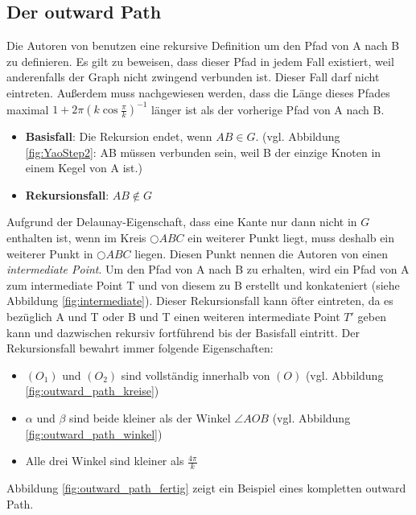 \documentclass[a4paper,twoside]{IEEEtran}
\begin{document}
\subsection{Der outward Path}
Die Autoren von \cite{kanj} benutzen eine rekursive Definition um den Pfad von A nach B zu definieren.
Es gilt zu beweisen, dass dieser Pfad in jedem Fall existiert, weil anderenfalls der Graph nicht zwingend verbunden ist.
Dieser Fall darf nicht eintreten.
Außerdem muss nachgewiesen werden, dass die Länge dieses Pfades maximal
$1+2\pi(k \cos{\frac{\pi}{k}})^{-1} $ länger ist als der vorherige Pfad von A nach B.


\begin{itemize}
\item \textbf{Basisfall}: Die Rekursion endet, wenn $AB \in G $. (vgl. Abbildung \ref{fig:YaoStep2}: AB müssen verbunden sein, weil B der einzige Knoten in einem Kegel von A ist.)
\item \textbf{Rekursionsfall}: $AB \notin G $
\end{itemize}

Aufgrund der Delaunay-Eigenschaft, dass eine Kante nur dann nicht in $G $ enthalten ist, wenn im Kreis $\bigcirc {ABC} $ ein weiterer Punkt liegt, muss deshalb ein weiterer Punkt in  $\bigcirc {ABC} $ liegen.
Diesen Punkt nennen die Autoren von \cite{kanj} einen \emph{intermediate Point}.
Um den Pfad von A nach B zu erhalten, wird ein Pfad von A zum intermediate Point T und von diesem zu B erstellt und konkateniert (siehe Abbildung \ref{fig:intermediate}).
Dieser Rekursionsfall kann öfter eintreten, da es bezüglich A und T oder B und T einen weiteren intermediate Point $T' $ geben kann und dazwischen rekursiv fortführend bis der Basisfall eintritt.
Der Rekursionsfall bewahrt immer folgende Eigenschaften:
\begin{itemize}
\item $(O_1) $ und $(O_2) $ sind vollständig innerhalb von $(O) $ (vgl. Abbildung \ref{fig:outward_path_kreise})
\item $\alpha $ und $\beta $ sind beide kleiner als der Winkel $\angle {AOB} $ (vgl. Abbildung \ref{fig:outward_path_winkel}) 
\item Alle drei Winkel sind kleiner als $\frac{4\pi}{k} $
\end{itemize}

Abbildung \ref{fig:outward_path_fertig} zeigt ein Beispiel eines kompletten outward Path.
\end{document}
